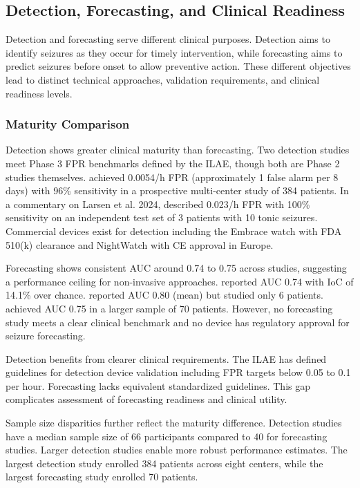 \subsection{Detection, Forecasting, and Clinical Readiness}

Detection and forecasting serve different clinical purposes. Detection aims to identify seizures as they occur for timely intervention, while forecasting aims to predict seizures before onset to allow preventive action. These different objectives lead to distinct technical approaches, validation requirements, and clinical readiness levels.

\subsubsection{Maturity Comparison}

Detection shows greater clinical maturity than forecasting. Two detection studies meet Phase 3 FPR benchmarks defined by the ILAE, though both are Phase 2 studies themselves. \textcite{spahrDeepLearningbasedDetection2025} achieved 0.0054/h FPR (approximately 1 false alarm per 8 days) with 96\% sensitivity in a prospective multi-center study of 384 patients. In a commentary on Larsen et al. 2024, \textcite{fineDetectionKeyAutomated2025} described 0.023/h FPR with 100\% sensitivity on an independent test set of 3 patients with 10 tonic seizures. Commercial devices exist for detection including the Embrace watch with FDA 510(k) clearance and NightWatch with CE approval in Europe.

Forecasting shows consistent AUC around 0.74 to 0.75 across studies, suggesting a performance ceiling for non-invasive approaches. \textcite{meiselMachineLearningWristband2020} reported AUC 0.74 with IoC of 14.1\% over chance. \textcite{nasseriAmbulatorySeizureForecasting2021} reported AUC 0.80 (mean) but studied only 6 patients. \textcite{vielufSeizureMonitoringCombined2025} achieved AUC 0.75 in a larger sample of 70 patients. However, no forecasting study meets a clear clinical benchmark and no device has regulatory approval for seizure forecasting.

Detection benefits from clearer clinical requirements. The ILAE has defined guidelines for detection device validation including FPR targets below 0.05 to 0.1 per hour. Forecasting lacks equivalent standardized guidelines. This gap complicates assessment of forecasting readiness and clinical utility.

Sample size disparities further reflect the maturity difference. Detection studies have a median sample size of 66 participants compared to 40 for forecasting studies. Larger detection studies enable more robust performance estimates. The largest detection study enrolled 384 patients across eight centers, while the largest forecasting study enrolled 70 patients.

